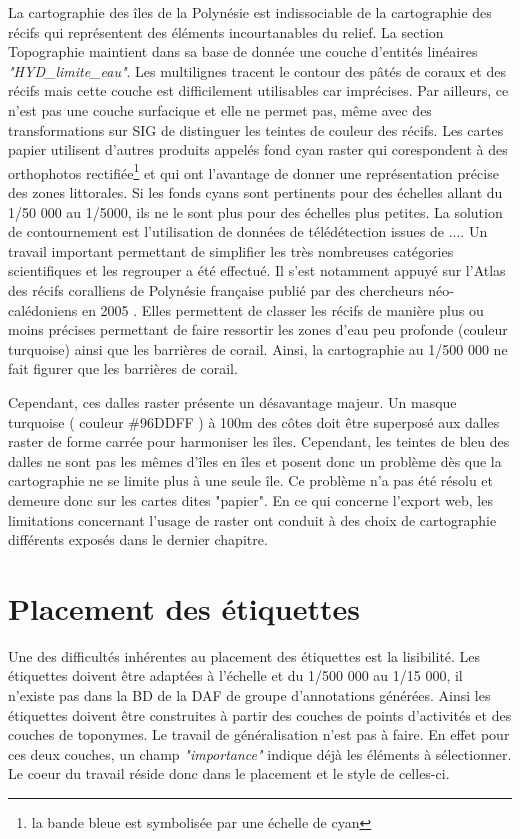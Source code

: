 La cartographie des îles de la Polynésie est indissociable de la cartographie des récifs qui représentent des éléments incourtanables du relief. La section Topographie maintient dans sa base de donnée une couche d'entités linéaires
\textit{"HYD\_limite\_eau"}. Les multilignes tracent le contour des pâtés de coraux et des récifs mais cette couche est difficilement utilisables car imprécises. Par ailleurs, ce n'est pas une couche surfacique et elle ne permet pas, même avec des transformations sur SIG de distinguer les teintes de couleur des récifs.
Les cartes papier utilisent d'autres produits appelés fond cyan raster qui corespondent à des orthophotos rectifiée\footnote{la bande bleue est symbolisée par une échelle de cyan} et qui ont l'avantage de donner une représentation précise des zones littorales. Si les fonds cyans sont pertinents pour des échelles allant du 1/50 000 au 1/5000, ils ne le sont plus pour des échelles plus petites. La solution de contournement est l'utilisation de données de télédétection issues de ....
Un travail important permettant de simplifier les très nombreuses catégories scientifiques et les regrouper a été effectué. Il s'est notamment appuyé sur  l'Atlas des récifs coralliens de Polynésie française publié par des chercheurs néo-calédoniens en 2005 \cite{Noumea_2005}.
Elles permettent de classer les récifs de manière plus ou moins précises permettant de faire ressortir les zones d'eau peu profonde (couleur turquoise) ainsi que les barrières de corail. Ainsi, la cartographie au 1/500 000 ne fait figurer que les barrières de corail.

Cependant, ces dalles raster présente un désavantage majeur. Un masque turquoise ( couleur \#96DDFF ) à 100m des côtes doit être superposé aux dalles raster de forme carrée pour harmoniser les îles. Cependant, les teintes de bleu des dalles ne sont pas les mêmes d'îles en îles et posent donc un problème dès que la cartographie ne se limite plus à une seule île. Ce problème n'a pas été résolu et demeure donc sur les cartes dites "papier". En ce qui concerne l'export web, les limitations concernant l'usage de raster ont conduit à des choix de cartographie différents exposés dans le dernier chapitre.



\section {Placement des étiquettes}

Une des difficultés inhérentes au placement des étiquettes est la lisibilité. Les étiquettes doivent être adaptées à l'échelle et du 1/500 000 au 1/15 000, il n'existe pas dans la BD de la DAF de groupe d'annotations générées. Ainsi les étiquettes doivent être construites à partir des couches de points d'activités et des couches de toponymes. Le travail de généralisation n'est pas à faire. En effet pour ces deux couches, un champ \textit{"importance"} indique déjà les éléments à sélectionner. Le coeur du travail réside donc dans le placement et le style de celles-ci.

